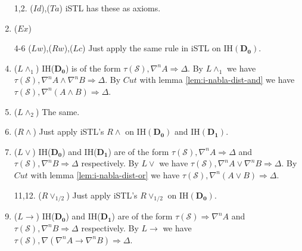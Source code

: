 \begin{enumerate}
	\item[1,2.] ($Id$),($Ta$) iSTL has these as axioms.
	\setcounter{enumi}{2}

	\item ($Ex$) 

	\item[4-6] ($Lw$),($Rw$),($Lc$) Just apply the same rule in iSTL on IH$(\mathbf{D_0})$.
	\setcounter{enumi}{6}

	\item ($L\land_1$) IH($\mathbf{D_0}$) is of the form $\tau(\mathcal{S}) , \nabla^n A \Rightarrow \Delta$. By $L\land_1$ we have $\tau(\mathcal{S}) , \nabla^n A \land \nabla^n B \Rightarrow \Delta$. By $Cut$ with lemma \ref{lem:i-nabla-dist-and} we have $\tau(\mathcal{S}) , \nabla^n (A \land B) \Rightarrow \Delta$.
	
	\item ($L\land_2$) The same.
	
	\item ($R\land$) Just apply iSTL's $R\land$ on IH$(\mathbf{D_0})$ and IH$(\mathbf{D_1})$.
	
	\item ($L\lor$) IH($\mathbf{D_0}$) and IH($\mathbf{D_1}$) are of the form $\tau(\mathcal{S}) , \nabla^n A \Rightarrow \Delta$ and $\tau(\mathcal{S}) , \nabla^n B \Rightarrow \Delta$ respectively. By $L\lor$ we have $\tau(\mathcal{S}) , \nabla^n A \lor \nabla^n B \Rightarrow \Delta$. By $Cut$ with lemma \ref{lem:i-nabla-dist-or} we have $\tau(\mathcal{S}) , \nabla^n (A \lor B) \Rightarrow \Delta$.
	
	\item[11,12.] ($R\lor_{1/2}$) Just apply iSTL's $R\lor_{1/2}$ on IH$(\mathbf{D_0})$.
	\setcounter{enumi}{12}
	
	\item ($L\rightarrow$) IH($\mathbf{D_0}$) and IH($\mathbf{D_1}$) are of the form $\tau(\mathcal{S}) \Rightarrow \nabla^n A$ and $\tau(\mathcal{S}) , \nabla^n B \Rightarrow \Delta$ respectively. By $L\rightarrow$ we have $\tau(\mathcal{S}) , \nabla (\nabla^n A \rightarrow \nabla^n B) \Rightarrow \Delta$. \todo{}
	
	\todo{}
\end{enumerate}

